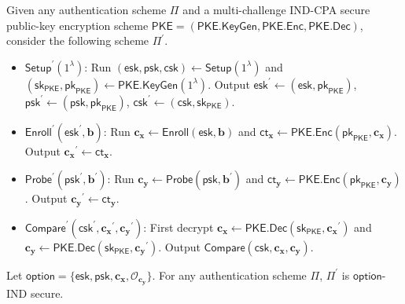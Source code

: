 Given any authentication scheme $\Pi$ and a multi-challenge IND-CPA secure public-key encryption scheme $\mathsf{PKE} = (\mathsf{PKE.KeyGen}, \allowbreak \mathsf{PKE.Enc}, \mathsf{PKE.Dec})$, consider the following scheme $\Pi^\prime$. 

\begin{itemize}

	\item $\mathsf{Setup}^\prime (1^\lambda)$: Run $(\mathsf{esk}, \mathsf{psk}, \mathsf{csk}) \gets \mathsf{Setup}(1^\lambda)$ and $(\mathsf{sk}_{\mathsf{PKE}}, \mathsf{pk}_{\mathsf{PKE}}) \gets \mathsf{PKE.KeyGen}(1^\lambda)$. Output $\mathsf{esk}^\prime \gets ( \mathsf{esk}, \mathsf{pk}_{\mathsf{PKE}} ) $, $\mathsf{psk}^\prime \gets (\mathsf{psk}, \mathsf{pk}_{\mathsf{PKE}})$, $\mathsf{csk}^\prime \gets (\mathsf{csk}, \mathsf{sk}_{\mathsf{PKE}} )$.

	\item $\mathsf{Enroll}^\prime (\mathsf{esk}^\prime, \mathbf{b})$: Run $\mathbf{c_x} \gets \mathsf{Enroll}(\mathsf{esk}, \mathbf{b})$ and $\mathsf{ct}_{\mathbf{x}} \gets \mathsf{PKE.Enc}(\mathsf{pk}_{\mathsf{PKE}}, \mathbf{c_x})$. Output $\mathbf{c_x}^\prime \gets \mathsf{ct}_{\mathbf{x}}$.

	\item $\mathsf{Probe}^\prime (\textsf{psk}^\prime, \mathbf{b}^\prime)$: Run $\mathbf{c_y} \gets \textsf{Probe}(\textsf{psk}, \mathbf{b}^\prime)$ and $\textsf{ct}_{\mathbf{y}} \gets \textsf{PKE.Enc}(\textsf{pk}_{\textsf{PKE}}, \mathbf{c_y})$. Output $\mathbf{c_y}^\prime \gets \textsf{ct}_{\mathbf{y}}$.

	\item $\textsf{Compare}^\prime (\textsf{csk}^\prime, \mathbf{c_x}^\prime, \mathbf{c_y}^\prime)$: First decrypt $\mathbf{c_x} \gets \textsf{PKE.Dec}(\textsf{sk}_{\textsf{PKE}}, \mathbf{c_x}^\prime)$ and  $\mathbf{c_y} \gets \textsf{PKE.Dec}(\textsf{sk}_{\textsf{PKE}}, \mathbf{c_y}^\prime)$. Output $\textsf{Compare}(\textsf{csk}, \mathbf{c_x}, \mathbf{c_y})$.
\end{itemize}

\begin{theorem}
\label{thm:mc-ind-cpa:ind-esk-psk}
	Let $\textsf{option} = \{ \textsf{esk}, \textsf{psk}, \mathbf{c_x}, \mathcal{O}_{\mathbf{c_y}} \}$. For any authentication scheme $\Pi$, $\Pi^\prime$ is $\textsf{option}$-IND secure. 
\end{theorem}

